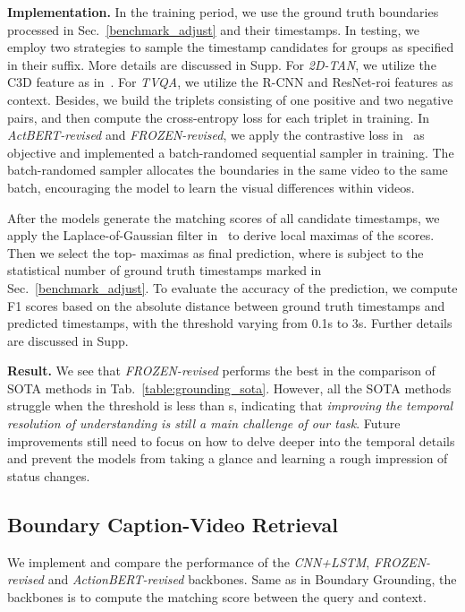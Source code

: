 \documentclass[runningheads]{llncs}
\begin{document}
\textbf{Implementation.} 
In the training period, we use the ground truth boundaries processed in Sec.~\ref{benchmark_adjust} and their timestamps. In testing, we employ two strategies to sample the timestamp candidates for groups as specified in their suffix. More details are discussed in Supp.
For \textit{2D-TAN}, we utilize the C3D feature as in~\cite{2DTAN_2020_AAAI}. For \textit{TVQA}, we utilize the R-CNN and ResNet-roi features as context. Besides, we build the triplets consisting of one positive and two negative pairs, and then compute the cross-entropy loss for each triplet in training. In \textit{ActBERT-revised} and \textit{FROZEN-revised}, we apply the contrastive loss in~\cite{bain2021frozen} as objective and implemented a batch-randomed sequential sampler in training. The batch-randomed sampler allocates the boundaries in the same video to the same batch, encouraging the model to learn the visual differences within videos.

After the models generate the matching scores of all candidate timestamps, we apply the Laplace-of-Gaussian filter in~\cite{shou2021generic} to derive local maximas of the scores. Then we select the top- maximas as final prediction, where  is subject to the statistical number of ground truth timestamps marked in Sec.~\ref{benchmark_adjust}. To evaluate the accuracy of the prediction, we compute F1 scores based on the absolute distance between ground truth timestamps and predicted timestamps, with the threshold varying from 0.1s to 3s. Further details are discussed in Supp.

\textbf{Result.}
We see that \textit{FROZEN-revised} performs the best in the comparison of SOTA methods in Tab.~\ref{table:grounding_sota}. However, all the SOTA methods struggle when the threshold is less than s, indicating that \textit{improving the temporal resolution of understanding is still a main challenge of our task}. Future improvements still need to focus on how to delve deeper into the temporal details and prevent the models from taking a glance and learning a rough impression of status changes.

\subsection{Boundary Caption-Video Retrieval}
We implement and compare the performance of the \textit{CNN+LSTM}, \textit{FROZEN-revised} and \textit{ActionBERT-revised} backbones. Same as in Boundary Grounding, the backbones is to compute the matching score between the query and context.
\end{document}
